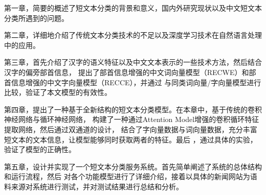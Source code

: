 第一章，简要的概述了短文本分类的背景和意义，国内外研究现状以及中文短文本分类所遇到的问题。

第二章，详细地介绍了传统文本分类技术的不足以及深度学习技术在自然语言处理中的应用。

第三章，首先介绍了汉字的语义特征以及中文文本表示的一些技术方法，然后结合汉字的偏旁部首信息，
提出了部首信息增强的中文词向量模型（RECWE）和部首信息增强的中文字向量模型（RECCE），并通过
与同类词向量/字向量模型进行比较，验证了本文模型的有效性。

第四章，提出了一种基于全新结构的短文本分类模型。在本章中，基于传统的卷积神经网络与循环神经网络，
构建了一种通过Attention Model增强的卷积循环特征提取网络，然后通过双通道的设计，
结合了字向量数据与词向量数据，充分丰富短文本的文本信息，让模型能够同时获取两者的特征。最后
，通过具体的实验，验证了模型的正确性。

第五章，设计并实现了一个短文本分类服务系统。首先简单阐述了系统的总体结构和运行流程，然后
对各个功能模型进行了详细介绍，接着以具体的新闻网站为语料来源对系统进行测试，并对测试结果进行总结和分析。